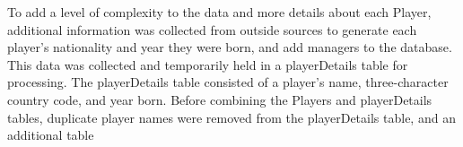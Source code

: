 
To add a level of complexity to the data and more details about each Player, additional information was collected from outside sources to generate each player's nationality and year they were born, and add managers to the database. %
This data was collected and temporarily held in a playerDetails table for processing. The playerDetails table consisted of a player's name, three-character country code, and year born. Before combining the Players and playerDetails tables, duplicate player names were removed from the playerDetails table, and an additional table %
